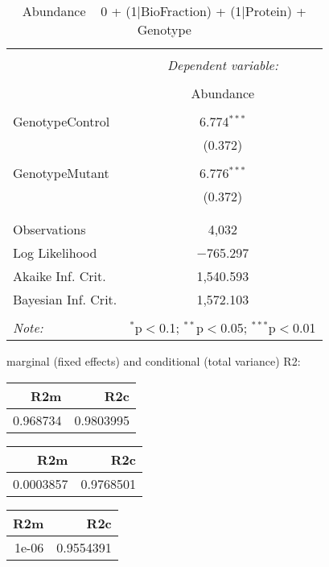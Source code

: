 \documentclass[11pt]{report}
\begin{document}
\begin{table}[!htbp] \centering 
  \caption{Abundance ~ 0 + (1|BioFraction) + (1|Protein) + Genotype} 
  \label{} 
\begin{tabular}{@{\extracolsep{5pt}}lc} 
\\[-1.8ex]\hline 
\hline \\[-1.8ex] 
 & \multicolumn{1}{c}{\textit{Dependent variable:}} \\ 
\cline{2-2} 
\\[-1.8ex] & Abundance \\ 
\hline \\[-1.8ex] 
 GenotypeControl & 6.774$^{***}$ \\ 
  & (0.372) \\ 
  & \\ 
 GenotypeMutant & 6.776$^{***}$ \\ 
  & (0.372) \\ 
  & \\ 
\hline \\[-1.8ex] 
Observations & 4,032 \\ 
Log Likelihood & $-$765.297 \\ 
Akaike Inf. Crit. & 1,540.593 \\ 
Bayesian Inf. Crit. & 1,572.103 \\ 
\hline 
\hline \\[-1.8ex] 
\textit{Note:}  & \multicolumn{1}{r}{$^{*}$p$<$0.1; $^{**}$p$<$0.05; $^{***}$p$<$0.01} \\ 
\end{tabular} 
\end{table} 
marginal (fixed effects) and conditional (total variance) R2:

\begin{tabular}{r|r}
\hline
R2m & R2c\\
\hline
0.968734 & 0.9803995\\
\hline
\end{tabular}

\begin{tabular}{r|r}
\hline
R2m & R2c\\
\hline
0.0003857 & 0.9768501\\
\hline
\end{tabular}

\begin{tabular}{r|r}
\hline
R2m & R2c\\
\hline
1e-06 & 0.9554391\\
\hline
\end{tabular}
\end{document}
